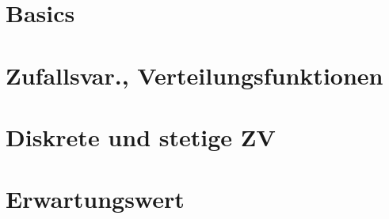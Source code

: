\documentclass{article}
\begin{document}
\startDocument
\noverticalspacing

\section{Basics}








\newsection
\section{Zufallsvar., Verteilungsfunktionen}






\newsectionNoPB
\section{Diskrete und stetige ZV}













% 

\newsectionNoPB
\section{Erwartungswert}







% 
\end{document}
